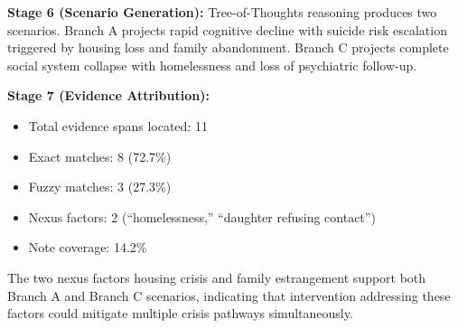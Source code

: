 \documentclass[conference]{IEEEtran}
\begin{document}
\textbf{Stage 6 (Scenario Generation):} Tree-of-Thoughts reasoning produces two scenarios. Branch A projects rapid cognitive decline with suicide risk escalation triggered by housing loss and family abandonment. Branch C projects complete social system collapse with homelessness and loss of psychiatric follow-up.

\textbf{Stage 7 (Evidence Attribution):}
\begin{itemize}
    \item Total evidence spans located: 11
    \item Exact matches: 8 (72.7\%)
    \item Fuzzy matches: 3 (27.3\%)
    \item Nexus factors: 2 (``homelessness,'' ``daughter refusing contact'')
    \item Note coverage: 14.2\%
\end{itemize}

The two nexus factors housing crisis and family estrangement support both Branch A and Branch C scenarios, indicating that intervention addressing these factors could mitigate multiple crisis pathways simultaneously.




\end{document}
